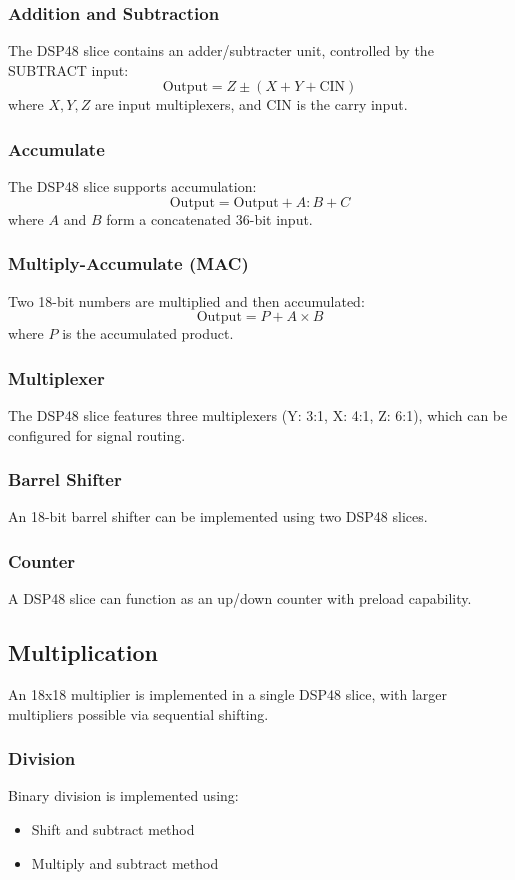 \documentclass{article}
\begin{document}
	\subsubsection{Addition and Subtraction}
	The DSP48 slice contains an adder/subtracter unit, controlled by the SUBTRACT input:
	\[
	\text{Output} = Z \pm (X + Y + \text{CIN})
	\]
	where \(X, Y, Z\) are input multiplexers, and CIN is the carry input.
	
	\subsubsection{Accumulate}
	The DSP48 slice supports accumulation:
	\[
	\text{Output} = \text{Output} + A:B + C
	\]
	where \(A\) and \(B\) form a concatenated 36-bit input.
	
	\subsubsection{Multiply-Accumulate (MAC)}
	Two 18-bit numbers are multiplied and then accumulated:
	\[
	\text{Output} = P + A \times B
	\]
	where \(P\) is the accumulated product.
	
	\subsubsection{Multiplexer}
	The DSP48 slice features three multiplexers (Y: 3:1, X: 4:1, Z: 6:1), which can be configured for signal routing.
	
	\subsubsection{Barrel Shifter}
	An 18-bit barrel shifter can be implemented using two DSP48 slices.
	
	\subsubsection{Counter}
	A DSP48 slice can function as an up/down counter with preload capability.
	
	\subsection{Multiplication}
	An 18x18 multiplier is implemented in a single DSP48 slice, with larger multipliers possible via sequential shifting.
	
	\subsubsection{Division}
	Binary division is implemented using:
	\begin{itemize}
		\item Shift and subtract method
		\item Multiply and subtract method
	\end{itemize}
	
\end{document}
